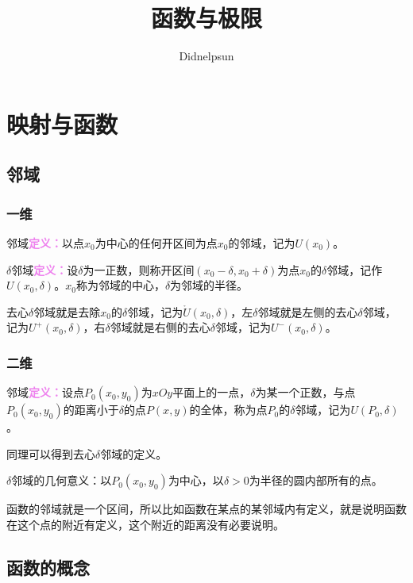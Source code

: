 \documentclass[UTF8, 12pt]{ctexart}
\author{Didnelpsun}
\title{函数与极限}
\date{}
\begin{document}
    \renewcommand{\arraystretch}{1.5}
    \maketitle
    \pagestyle{empty}
    \thispagestyle{empty}
    \tableofcontents
    \thispagestyle{empty}
    \newpage
    \pagestyle{plain}
    \setcounter{page}{1}


    \section{映射与函数}

    \subsection{邻域}

    \subsubsection{一维}

    邻域\textcolor{violet}{\textbf{定义：}}以点$x_0$为中心的任何开区间为点$x_0$的邻域，记为$U(x_0)$。

    $\delta$邻域\textcolor{violet}{\textbf{定义：}}设$\delta$为一正数，则称开区间$(x_0-\delta,x_0+\delta)$为点$x_0$的$\delta$邻域，记作$U(x_0,\delta)$。$x_0$称为邻域的中心，$\delta$为邻域的半径。

    去心$\delta$邻域就是去除$x_0$的$\delta$邻域，记为$\mathring{U}(x_0,\delta)$，左$\delta$邻域就是左侧的去心$\delta$邻域，记为$U^+(x_0,\delta)$，右$\delta$邻域就是右侧的去心$\delta$邻域，记为$U^-(x_0,\delta)$。

    \subsubsection{二维}

    邻域\textcolor{violet}{\textbf{定义：}}设点$P_0(x_0,y_0)$为$xOy$平面上的一点，$\delta$为某一个正数，与点$P_0(x_0,y_0)$的距离小于$\delta$的点$P(x,y)$的全体，称为点$P_0$的$\delta$邻域，记为$U(P_0,\delta)$。

    同理可以得到去心$\delta$邻域的定义。

    $\delta$邻域的几何意义：以$P_0(x_0,y_0)$为中心，以$\delta>0$为半径的圆内部所有的点。

    函数的邻域就是一个区间，所以比如函数在某点的某邻域内有定义，就是说明函数在这个点的附近有定义，这个附近的距离没有必要说明。

    \subsection{函数的概念}
\end{document}
